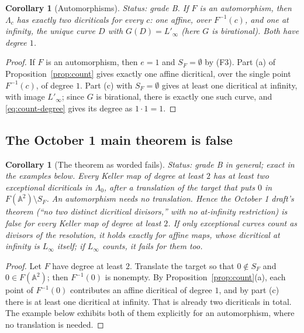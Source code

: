 \documentclass[a4paper,11pt]{article}
\theoremstyle{plain}
\newtheorem{corollary}[theorem]{Corollary}
\theoremstyle{definition}
\theoremstyle{remark}
\begin{document}
\begin{corollary}[Automorphisms]\label{cor:automorphisms}
\textit{Status: grade B.}
If $F$ is an automorphism, then $\Lambda_c$ has exactly two dicriticals for every $c$: one
affine, over $F^{-1}(c)$, and one at infinity, the unique curve $D$ with
$G(D) = L'_\infty$ (here $G$ is birational). Both have degree $1$.
\end{corollary}

\begin{proof}
If $F$ is an automorphism, then $e = 1$ and $S_F = \emptyset$ by (F3). Part (a) of
Proposition~\ref{prop:count} gives exactly one affine dicritical, over the single point
$F^{-1}(c)$, of degree $1$. Part (c) with $S_F = \emptyset$ gives at least one dicritical at
infinity, with image $L'_\infty$; since $G$ is birational, there is exactly one such curve,
and \eqref{eq:count-degree} gives its degree as $1 \cdot 1 = 1$.
\end{proof}

\subsection{The October 1 main theorem is false}

\begin{corollary}[The theorem as worded fails]\label{cor:count-fails}
\textit{Status: grade B in general; exact in the examples below.}
Every Keller map of degree at least $2$ has at least two exceptional dicriticals in
$\Lambda_0$, after a translation of the target that puts $0$ in
$F(\mathbb{A}^2) \setminus S_F$. An automorphism needs no translation. Hence the October 1
draft's theorem (``no two distinct dicritical divisors,'' with no at-infinity restriction) is
false for every Keller map of degree at least $2$. If only exceptional curves count as
divisors of the resolution, it holds exactly for affine maps, whose dicritical at infinity is
$L_\infty$ itself; if $L_\infty$ counts, it fails for them too.
\end{corollary}

\begin{proof}
Let $F$ have degree at least $2$. Translate the target so that $0 \notin S_F$ and
$0 \in F(\mathbb{A}^2)$; then $F^{-1}(0)$ is nonempty. By Proposition~\ref{prop:count}(a),
each point of $F^{-1}(0)$ contributes an affine dicritical of degree $1$, and by part (c)
there is at least one dicritical at infinity. That is already two dicriticals in total. The
example below exhibits both of them explicitly for an automorphism, where no translation is
needed.
\end{proof}
\end{document}

